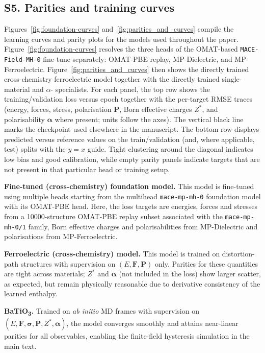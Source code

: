 \documentclass[aps,physrev,graphicx,amsmath,amssymb,reprint]{revtex4-2} %
\begin{document}
\subsection*{S5. Parities and training curves}

Figures~\ref{fig:foundation-curves} and~\ref{fig:parities_and_curves} compile the learning curves and parity plots for the models used throughout the paper. Figure~\ref{fig:foundation-curves} resolves the three heads of the OMAT-based \texttt{MACE-Field-MH-0} fine-tune separately: OMAT-PBE replay, MP-Dielectric, and MP-Ferroelectric. Figure~\ref{fig:parities_and_curves} then shows the directly trained cross-chemistry ferroelectric model together with the directly trained single-material  and $\alpha$- specialists.
For each panel, the top row shows the training/validation loss versus epoch together with the per-target RMSE traces (energy, forces, stress, polarisation $\mathbf P$, Born effective charges $Z^*$, and polarisability $\boldsymbol\alpha$ where present; units follow the axes). The vertical black line marks the checkpoint used elsewhere in the manuscript. The bottom row displays predicted versus reference values on the train/validation (and, where applicable, test) splits with the $y{=}x$ guide. Tight clustering around the diagonal indicates low bias and good calibration, while empty parity panels indicate targets that are not present in that particular head or training setup.

\textbf{Fine-tuned (cross-chemistry) foundation model.} This model is fine-tuned using multiple heads starting from the multihead \texttt{mace-mp-mh-0} foundation model with its OMAT-PBE head. Here, the loss targets are energies, forces and stresses from a 10000-structure OMAT-PBE replay subset associated with the \texttt{mace-mp-mh-0/1} family, Born effective charges and polarisabilities from MP-Dielectric and polarisations from MP-Ferroelectric.

\textbf{Ferroelectric (cross-chemistry) model.} This model is trained on distortion-path structures with supervision on $(E,\mathbf F,\mathbf P)$ only. Parities for these quantities are tight across materials; $Z^*$ and $\boldsymbol\alpha$ (not included in the loss) show larger scatter, as expected, but remain physically reasonable due to derivative consistency of the learned enthalpy.

\textbf{BaTiO\textsubscript{3}.} Trained on \emph{ab initio} MD frames with supervision on $(E,\mathbf F,\boldsymbol\sigma,\mathbf P, Z^*,\boldsymbol\alpha)$, the model converges smoothly and attains near-linear parities for all observables, enabling the finite-field hysteresis simulation in the main text.
\end{document}
